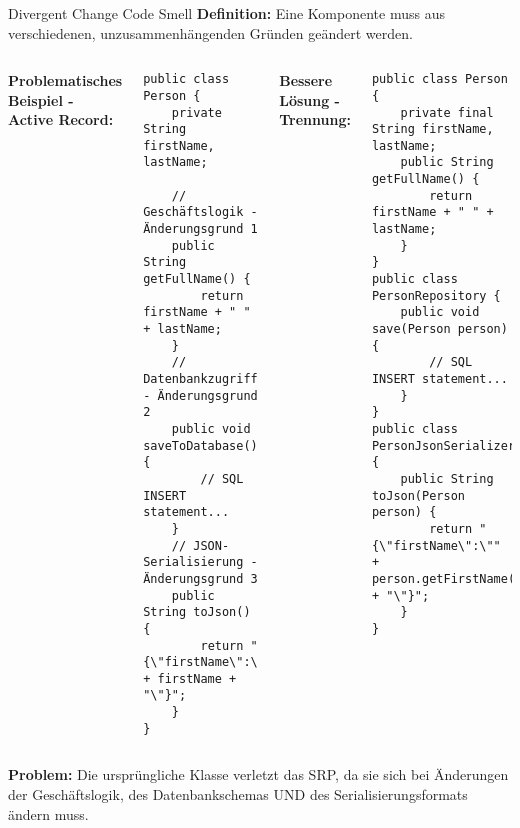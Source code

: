\begin{frame}[fragile]{Divergent Change Code Smell}
  \textbf{Definition:} Eine Komponente muss aus verschiedenen, unzusammenhängenden Gründen geändert werden.
  \begin{columns}[T]
    \textbf{Problematisches Beispiel - Active Record:}
    \begin{lstlisting}[style=java, basicstyle=\tiny\ttfamily]
public class Person {
    private String firstName, lastName;

    // Geschäftslogik - Änderungsgrund 1
    public String getFullName() {
        return firstName + " " + lastName;
    }
    // Datenbankzugriff - Änderungsgrund 2
    public void saveToDatabase() {
        // SQL INSERT statement...
    }
    // JSON-Serialisierung - Änderungsgrund 3
    public String toJson() {
        return "{\"firstName\":\"" + firstName + "\"}";
    }
}
    \end{lstlisting}
    \textbf{Bessere Lösung - Trennung:}
    \begin{lstlisting}[style=java, basicstyle=\tiny\ttfamily]
public class Person {
    private final String firstName, lastName;
    public String getFullName() {
        return firstName + " " + lastName;
    }
}
public class PersonRepository {
    public void save(Person person) {
        // SQL INSERT statement...
    }
}
public class PersonJsonSerializer {
    public String toJson(Person person) {
        return "{\"firstName\":\"" + person.getFirstName() + "\"}";
    }
}
    \end{lstlisting}
  \end{columns}
  \textbf{Problem:} Die ursprüngliche Klasse verletzt das SRP, da sie sich bei Änderungen der Geschäftslogik, des Datenbankschemas UND des Serialisierungsformats ändern muss.
\end{frame}

